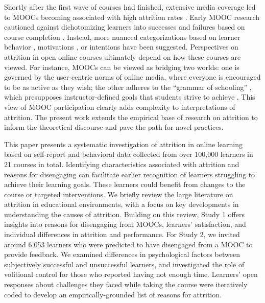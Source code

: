 \documentclass{sigchi}\usepackage[]{graphicx}\usepackage[]{color}
\begin{document}
Shortly after the first wave of courses had finished, extensive media coverage led to MOOCs becoming associated with high attrition rates \cite{lewin2013after,parr2013mooc}. Early MOOC research cautioned against dichotomizing learners into successes and failures based on course completion \cite{kizilcec2013deconstructing,rivard2013measuring}. Instead, more nuanced categorizations based on learner behavior \cite{kizilcec2013deconstructing,clow2013moocs}, motivations \cite{kizilcec2015motivation}, or intentions \cite{wilkowski2014student} have been suggested. Perspectives on attrition in open online courses ultimately depend on how these courses are viewed. For instance, MOOCs can be viewed as bridging two worlds: one is governed by the user-centric norms of online media, where everyone is encouraged to be as active as they wish; the other adheres to the ``grammar of schooling'' \cite{tyack1994grammar}, which presupposes instructor-defined goals that students strive to achieve \cite{kizilcec2015motivation}. This view of MOOC participation clearly adds complexity to interpretations of attrition. The present work extends the empirical base of research on attrition to inform the theoretical discourse and pave the path for novel practices.

This paper presents a systematic investigation of attrition in online learning based on self-report and behavioral data collected from over 100,000 learners in 21 courses in total. Identifying characteristics associated with attrition and reasons for disengaging can facilitate earlier recognition of learners struggling to achieve their learning goals. These learners could benefit from changes to the course or targeted interventions. We briefly review the large literature on attrition in educational environments, with a focus on key developments in understanding the causes of attrition. Building on this review, Study 1 offers insights into reasons for disengaging from MOOCs, learners' satisfaction, and individual differences in attrition and performance. For Study 2, we invited around 6,053 learners who were predicted to have disengaged from a MOOC to provide feedback. We examined differences in psychological factors between subjectively successful and unsuccessful learners, and investigated the role of volitional control for those who reported having not enough time. Learners' open responses about challenges they faced while taking the course were iteratively coded to develop an empirically-grounded list of reasons for attrition.
\end{document}
